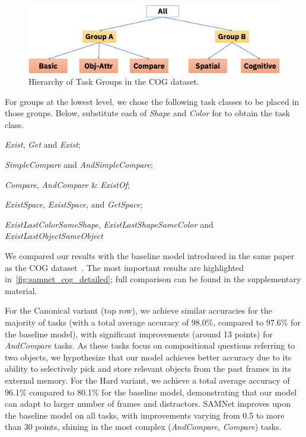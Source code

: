 \begin{figure}[htbp]
	\centering
	\includegraphics[width=\columnwidth]{../img/architecture/hierarchy}
	\caption{Hierarchy of Task Groups in the COG dataset.}
	\label{fig:task-groups}
\end{figure}



For groups at the lowest level, we chose the following task classes to be placed in those groups.
Below, substitute each of \textit{Shape} and \textit{Color} for  \uX{} to obtain the task class.
\begin{description}
	\compresslist
	\item[Basic:] \textit{Exist}\uX, \textit{Get}\uX{} and \textit{Exist};
	\item[Obj-Attr:] \emph{SimpleCompare}\uX{} and \textit{AndSimpleCompare}\uX;
	\item[Compare:] \textit{Compare}\uX,  \textit{AndCompare}\uX{} \& \textit{Exist}\uX\textit{Of};
	\item[Spatial:] \textit{ExistSpace}, \textit{Exist}\uX\textit{Space}, and \textit{Get}\uX\textit{Space};
	\item[Cognitive:] \textit{ExistLastColorSameShape}, \textit{ExistLastShapeSameColor} and \textit{ExistLastObjectSameObject}
\end{description}


We compared our results with the baseline model introduced in the same paper as the COG dataset~\cite{yang2018dataset}.
The most important results are highlighted in~\cref{fig:samnet_cog_detailed}; full comparison can be found in the supplementary material.

For the Canonical variant (top row), we achieve similar accuracies for the majority of tasks (with a total average accuracy of 98.0\%, compared to 97.6\% for the baseline model), with significant improvements (around 13 points) for \textit{AndCompare} tasks.
As these tasks focus on compositional questions referring to two objects, we hypothesize that our model achieves better accuracy due to its ability to selectively pick and store relevant objects from the past frames in its external memory.
For the Hard variant, we achieve a total average accuracy of 96.1\% compared to 80.1\% for the baseline model, demonstrating that our model can adapt to larger number of frames and distractors.
SAMNet improves upon the baseline model on all tasks, with improvements varying from 0.5 to more than 30 points, shining in the most complex (\textit{AndCompare}\uX, \textit{Compare}\uX) tasks.


